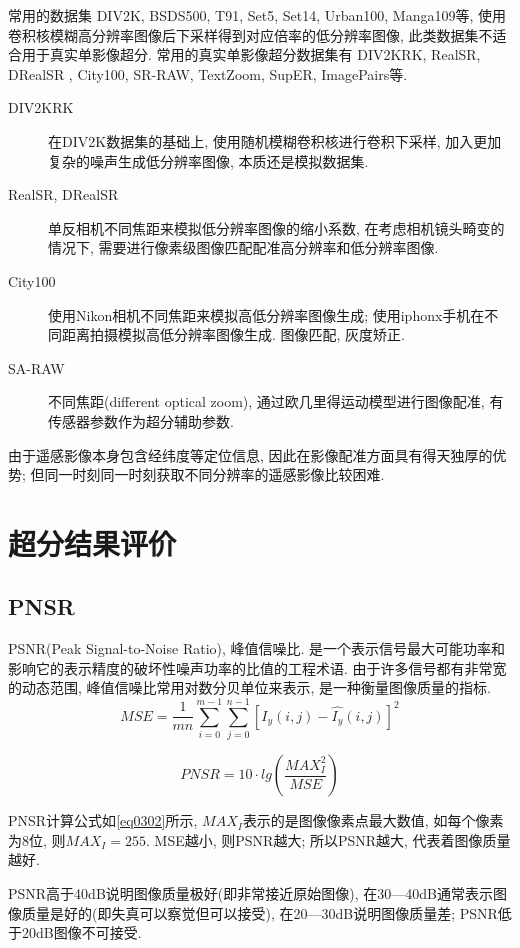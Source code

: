 常用的数据集 DIV2K, BSDS500, T91, Set5, Set14, Urban100, Manga109等, 使用卷积核模糊高分辨率图像后下采样得到对应倍率的低分辨率图像, 此类数据集不适合用于真实单影像超分. 常用的真实单影像超分数据集有 DIV2KRK, RealSR, DRealSR , City100, SR-RAW, TextZoom, SupER, ImagePairs等. 

\begin{description}
    \item[DIV2KRK] 在DIV2K数据集的基础上, 使用随机模糊卷积核进行卷积下采样, 加入更加复杂的噪声生成低分辨率图像, 本质还是模拟数据集.
    \item[RealSR, DRealSR] 单反相机不同焦距来模拟低分辨率图像的缩小系数, 在考虑相机镜头畸变的情况下, 需要进行像素级图像匹配配准高分辨率和低分辨率图像.
    \item[City100] 使用Nikon相机不同焦距来模拟高低分辨率图像生成; 使用iphonx手机在不同距离拍摄模拟高低分辨率图像生成. 图像匹配, 灰度矫正.  
    \item[SA-RAW] 不同焦距(different optical zoom), 通过欧几里得运动模型进行图像配准, 有传感器参数作为超分辅助参数.
\end{description}

由于遥感影像本身包含经纬度等定位信息, 因此在影像配准方面具有得天独厚的优势; 但同一时刻同一时刻获取不同分辨率的遥感影像比较困难. 

\section{超分结果评价}
\subsection{PNSR}
PSNR(Peak Signal-to-Noise Ratio), 峰值信噪比. 是一个表示信号最大可能功率和影响它的表示精度的破坏性噪声功率的比值的工程术语. 由于许多信号都有非常宽的动态范围, 峰值信噪比常用对数分贝单位来表示, 是一种衡量图像质量的指标. 
\begin{equation}
    MSE=\dfrac{1}{mn}\sum_{i=0}^{m-1}\sum_{j=0}^{n-1}[I_{y}(i,j)-\hat{I_{y}}(i,j)]^{2}
\end{equation}

\begin{equation}
    PNSR=10\cdot lg(\dfrac{MAX_{I}^2}{MSE})
    \label{eq0302}
\end{equation}

PNSR计算公式如\ref{eq0302}所示, $MAX_{I}$表示的是图像像素点最大数值, 如每个像素为8位, 则$MAX_{I}=255$. MSE越小, 则PSNR越大; 所以PSNR越大, 代表着图像质量越好.

PSNR高于40dB说明图像质量极好(即非常接近原始图像), 在30—40dB通常表示图像质量是好的(即失真可以察觉但可以接受), 在20—30dB说明图像质量差; PSNR低于20dB图像不可接受.

